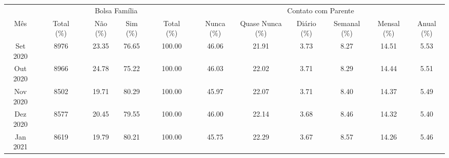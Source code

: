 \documentclass[12pt]{article}
\begin{document}
\begin{landscape}
\begin{table}[htbp]
\begin{adjustbox}{max width=\linewidth}
\begin{tabular}{lllllllllllllll}
         & \textcolor[rgb]{ 1,  1,  1}{} &      & \textcolor[rgb]{ 1,  1,  1}{} & \multicolumn{2}{c}{Bolsa Família} & \textcolor[rgb]{ 1,  1,  1}{} &      & \textcolor[rgb]{ 1,  1,  1}{} & \multicolumn{6}{c}{Contato com Parente} \\
\cmidrule{1-3}\cmidrule{5-6}\cmidrule{8-8}\cmidrule{10-15}    \multicolumn{1}{c}{Mês} &      & \multicolumn{1}{c}{Total (\%)} &      & \multicolumn{1}{c}{Não (\%)} & \multicolumn{1}{c}{Sim (\%)} &      & \multicolumn{1}{c}{Total (\%)} &      & \multicolumn{1}{c}{Nunca (\%)} & \multicolumn{1}{c}{Quase Nunca (\%)} & \multicolumn{1}{c}{Diário (\%)} & \multicolumn{1}{c}{Semanal (\%)} & \multicolumn{1}{c}{Mensal (\%)} & \multicolumn{1}{c}{Anual (\%)} \\
\cmidrule{1-3}\cmidrule{5-6}\cmidrule{8-8}\cmidrule{10-15}    \multicolumn{1}{c}{Set 2020} &      & \multicolumn{1}{c}{8976} &      & \multicolumn{1}{c}{23.35} & \multicolumn{1}{c}{76.65} &      & \multicolumn{1}{c}{100.00} &      & \multicolumn{1}{c}{46.06} & \multicolumn{1}{c}{21.91} & \multicolumn{1}{c}{3.73} & \multicolumn{1}{c}{8.27} & \multicolumn{1}{c}{14.51} & \multicolumn{1}{c}{5.53} \\
    \multicolumn{1}{c}{Out 2020} &      & \multicolumn{1}{c}{8966} &      & \multicolumn{1}{c}{24.78} & \multicolumn{1}{c}{75.22} &      & \multicolumn{1}{c}{100.00} &      & \multicolumn{1}{c}{46.03} & \multicolumn{1}{c}{22.02} & \multicolumn{1}{c}{3.71} & \multicolumn{1}{c}{8.29} & \multicolumn{1}{c}{14.44} & \multicolumn{1}{c}{5.51} \\
    \multicolumn{1}{c}{Nov 2020} &      & \multicolumn{1}{c}{8502} &      & \multicolumn{1}{c}{19.71} & \multicolumn{1}{c}{80.29} &      & \multicolumn{1}{c}{100.00} &      & \multicolumn{1}{c}{45.97} & \multicolumn{1}{c}{22.07} & \multicolumn{1}{c}{3.71} & \multicolumn{1}{c}{8.40} & \multicolumn{1}{c}{14.37} & \multicolumn{1}{c}{5.49} \\
    \multicolumn{1}{c}{Dez 2020} &      & \multicolumn{1}{c}{8577} &      & \multicolumn{1}{c}{20.45} & \multicolumn{1}{c}{79.55} &      & \multicolumn{1}{c}{100.00} &      & \multicolumn{1}{c}{46.00} & \multicolumn{1}{c}{22.14} & \multicolumn{1}{c}{3.68} & \multicolumn{1}{c}{8.46} & \multicolumn{1}{c}{14.32} & \multicolumn{1}{c}{5.40} \\
    \multicolumn{1}{c}{Jan 2021} &      & \multicolumn{1}{c}{8619} &      & \multicolumn{1}{c}{19.79} & \multicolumn{1}{c}{80.21} &      & \multicolumn{1}{c}{100.00} &      & \multicolumn{1}{c}{45.75} & \multicolumn{1}{c}{22.29} & \multicolumn{1}{c}{3.67} & \multicolumn{1}{c}{8.57} & \multicolumn{1}{c}{14.26} & \multicolumn{1}{c}{5.46} \\

\end{tabular}
\end{adjustbox}
\end{table}
\end{landscape}
\end{document}
